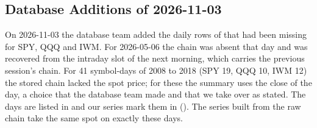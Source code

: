 \subsection{Database Additions of 2026-11-03}
\label{sup:ledger:additions}

On 2026-11-03 the database team added the daily rows of  that had been missing for SPY, QQQ and IWM. For 2026-05-06 the chain was absent that day and was recovered from the intraday slot of the next morning, which carries the previous session's chain. For 41 symbol-days of 2008 to 2018 (SPY 19, QQQ 10, IWM 12) the stored chain lacked the spot price; for these the summary uses the close of the day, a choice that the database team made and that we take over as stated. The days are listed in  and our series mark them in  (). The series built from the raw chain take the same spot on exactly these days.
